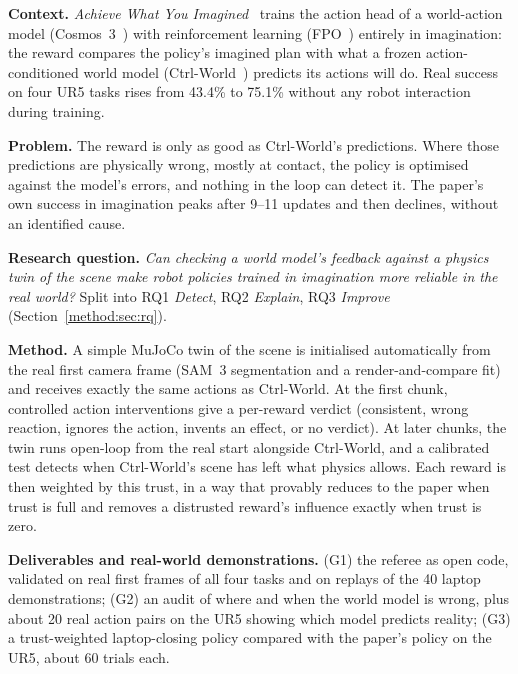 \begin{keybox}[title={\textbf{The proposal in brief}},fonttitle=\color{white}\bfseries,colbacktitle=blue!60!black]
\textbf{Context.} \emph{Achieve What You Imagined}~\cite{a2a} trains the action head of a world-action model (Cosmos~3~\cite{cosmos3}) with reinforcement learning (FPO~\cite{fpo}) entirely in imagination: the reward compares the policy's imagined plan with what a frozen action-conditioned world model (Ctrl-World~\cite{ctrlworld}) predicts its actions will do. Real success on four UR5 tasks rises from 43.4\% to 75.1\% without any robot interaction during training.

\textbf{Problem.} The reward is only as good as Ctrl-World's predictions. Where those predictions are physically wrong, mostly at contact, the policy is optimised against the model's errors, and nothing in the loop can detect it. The paper's own success in imagination peaks after 9--11 updates and then declines, without an identified cause.

\textbf{Research question.} \emph{Can checking a world model's feedback against a physics twin of the scene make robot policies trained in imagination more reliable in the real world?} Split into RQ1 \emph{Detect}, RQ2 \emph{Explain}, RQ3 \emph{Improve} (Section~\ref{method:sec:rq}).

\textbf{Method.} A simple MuJoCo twin of the scene is initialised automatically from the real first camera frame (SAM~3 segmentation and a render-and-compare fit) and receives exactly the same actions as Ctrl-World. At the first chunk, controlled action interventions give a per-reward verdict (consistent, wrong reaction, ignores the action, invents an effect, or no verdict). At later chunks, the twin runs open-loop from the real start alongside Ctrl-World, and a calibrated test detects when Ctrl-World's scene has left what physics allows. Each reward is then weighted by this trust, in a way that provably reduces to the paper when trust is full and removes a distrusted reward's influence exactly when trust is zero.

\textbf{Deliverables and real-world demonstrations.} (G1) the referee as open code, validated on real first frames of all four tasks and on replays of the 40 laptop demonstrations; (G2) an audit of where and when the world model is wrong, plus about 20 real action pairs on the UR5 showing which model predicts reality; (G3) a trust-weighted laptop-closing policy compared with the paper's policy on the UR5, about 60 trials each.
\end{keybox}

